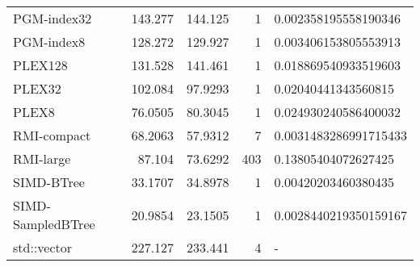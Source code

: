 \begin{tabular}{lrrrl}
 PGM-index32       &               143.277  &              144.125  &            1 & 0.002358195558190346  \\
 PGM-index8        &               128.272  &              129.927  &            1 & 0.003406153805553913  \\
 PLEX128           &               131.528  &              141.461  &            1 & 0.018869540933519603  \\
 PLEX32            &               102.084  &               97.9293 &            1 & 0.02040441343560815   \\
 PLEX8             &                76.0505 &               80.3045 &            1 & 0.024930240586400032  \\
 RMI-compact       &                68.2063 &               57.9312 &            7 & 0.0031483286991715433 \\
 RMI-large         &                87.104  &               73.6292 &          403 & 0.13805404072627425   \\
 SIMD-BTree        &                33.1707 &               34.8978 &            1 & 0.00420203460380435   \\
 SIMD-SampledBTree &                20.9854 &               23.1505 &            1 & 0.0028440219350159167 \\
 std::vector       &               227.127  &              233.441  &            4 & -                     \\
\hline
\end{tabular}